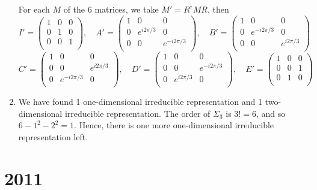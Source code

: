 \documentclass[a4paper]{article}
\begin{document}
\begin{ans}
\begin{enumerate}[label=(\roman*)]
For each $M$ of the 6 matrices, we take $M'=R^\dag MR$, then
$$I'=\begin{pmatrix}1&0&0\\0&1&0\\0&0&1\\\end{pmatrix},\quad A'=\begin{pmatrix}1&0&0\\0&e^{i2\pi/3}&0\\0&0&e^{-i2\pi/3}\\\end{pmatrix},\quad  B'=\begin{pmatrix}1&0&0\\0&e^{-i2\pi/3}&0\\0&0&e^{i2\pi/3}\\\end{pmatrix}$$
$$C'=\begin{pmatrix}1&0&0\\0&0&e^{i2\pi/3}\\0&e^{-i2\pi/3}&0\\\end{pmatrix},\quad D'=\begin{pmatrix}1&0&0\\0&0&e^{-i2\pi/3}\\0&e^{i2\pi/3}&0\\\end{pmatrix},\quad  E'=\begin{pmatrix}1&0&0\\0&0&1\\0&1&0\\\end{pmatrix}$$
\item We have found 1 one-dimensional irreducible representation and 1 two-dimensional irreducible representation. The order of $\Sigma_3$ is $3!=6$, and so $6-1^2-2^2=1$. Hence, there is one more one-dimensional irreducible representation left.
\end{enumerate}
\end{ans}
\newpage
\section{2011}
\end{document}
